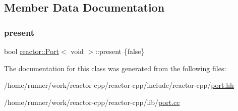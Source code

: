 \subsection{Member Data Documentation}
\mbox{\label{classreactor_1_1Port_3_01void_01_4_aa9ab4e50d097ed98354eb6508f4e7085}} 
\subsubsection{\texorpdfstring{present}{present}}
{\footnotesize\ttfamily bool \hyperlink{classreactor_1_1Port}{reactor\+::\+Port}$<$ void $>$\+::present \{false\}\hspace{0.3cm}{\ttfamily [private]}}



The documentation for this class was generated from the following files\+:\begin{DoxyCompactItemize}
\item 
/home/runner/work/reactor-\/cpp/reactor-\/cpp/include/reactor-\/cpp/\hyperlink{port_8hh}{port.\+hh}\item 
/home/runner/work/reactor-\/cpp/reactor-\/cpp/lib/\hyperlink{port_8cc}{port.\+cc}\end{DoxyCompactItemize}
